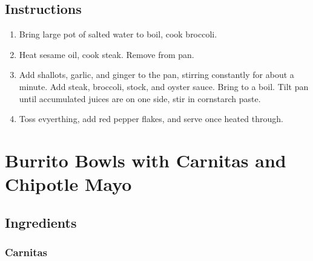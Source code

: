 \documentclass[ansiapaper,10pt,english]{sphinxmanual}
\begin{document}
\section{Instructions}
\label{\detokenize{Beef_Broc:instructions}}\begin{enumerate}
\item {} 
Bring large pot of salted water to boil, cook broccoli.

\item {} 
Heat sesame oil, cook steak. Remove from pan.

\item {} 
Add shallots, garlic, and ginger to the pan, stirring constantly for about a minute. Add steak, broccoli, stock, and oyster sauce. Bring to a boil. Tilt pan until accumulated juices are on one side, stir in cornstarch paste.

\item {} 
Toss evyerthing, add red pepper flakes, and serve once heated through.

\end{enumerate}


\chapter{Burrito Bowls with Carnitas and Chipotle Mayo}
\label{\detokenize{Burrito_Bowl:burrito-bowls-with-carnitas-and-chipotle-mayo}}\label{\detokenize{Burrito_Bowl::doc}}

\section{Ingredients}
\label{\detokenize{Burrito_Bowl:ingredients}}

\subsection{Carnitas}
\label{\detokenize{Burrito_Bowl:carnitas}}
%
\begin{sphinxVerbatim}[commandchars=\\\{\}]
           

   

         

     

   

     
\end{sphinxVerbatim}
\end{document}
